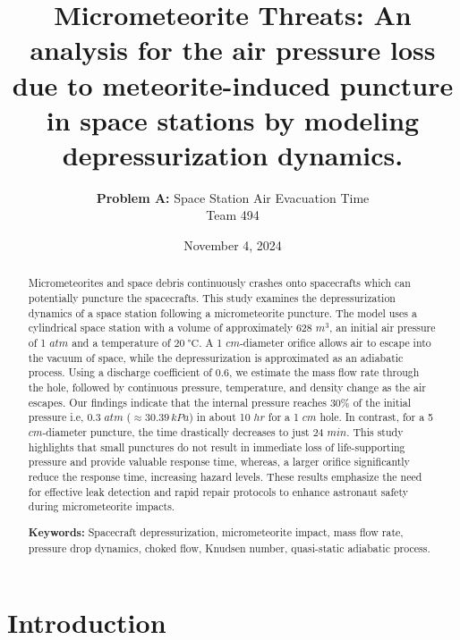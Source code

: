 \documentclass[a4paper, 14pt]{extarticle}
\begin{document}
\title{Micrometeorite Threats: An analysis for the air pressure loss due to meteorite-induced puncture in space stations by modeling depressurization dynamics.}
\author{\textbf{Problem A:} Space Station Air Evacuation Time\\Team 494}
\date{November 4, 2024}
\maketitle
\begin{abstract}
\normalsize %
Micrometeorites and space debris continuously crashes onto spacecrafts which can potentially puncture the spacecrafts.
This study examines the depressurization dynamics of a space station following a micrometeorite puncture. The model uses a cylindrical space station with a volume of approximately 628 $m^3$, an initial air pressure of 1 $atm$ and a temperature of $\SI{20}{\degreeCelsius}$. A 1 $cm$-diameter orifice allows air to escape into the vacuum of space, while the depressurization is approximated as an adiabatic process. Using a discharge coefficient of 0.6, we estimate the mass flow rate through the hole, followed by continuous pressure, temperature, and density change as the air escapes. Our findings indicate that the internal pressure reaches 30\% of the initial pressure i.e, 0.3 $atm$ ($\approx30.39\,kPa$) in about 10 $hr$ for a 1 $cm$ hole. In contrast, for a 5 $cm$-diameter puncture, the time drastically decreases to just 24 $min$. This study highlights that small punctures do not result in immediate loss of life-supporting pressure and provide valuable response time, whereas, a larger orifice significantly reduce the response time, increasing hazard levels. These results emphasize the need for effective leak detection and rapid repair protocols to enhance astronaut safety during micrometeorite impacts.

\textbf{Keywords:} Spacecraft depressurization, micrometeorite impact, mass flow rate, pressure drop dynamics, choked flow, Knudsen number, quasi-static adiabatic process.
\end{abstract}
\newpage
\tableofcontents
\newpage
\section{Introduction}
\end{document}
